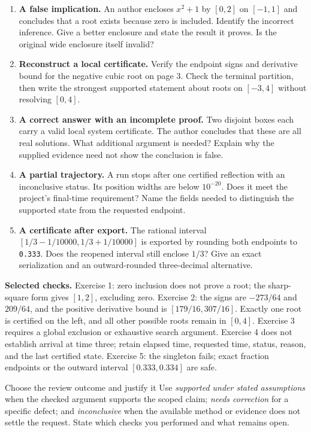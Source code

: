 \begin{enumerate}
\item \textbf{A false implication.} An author encloses $x^2+1$ by $[0,2]$
on $[-1,1]$ and concludes that a root exists because zero is included.
Identify the incorrect inference. Give a better enclosure and state the
result it proves. Is the original wide enclosure itself invalid?

\item \textbf{Reconstruct a local certificate.} Verify the endpoint signs
and derivative bound for the negative cubic root on page 3. Check the
terminal partition, then write the strongest supported statement about
roots on $[-3,4]$ without resolving $[0,4]$.

\item \textbf{A correct answer with an incomplete proof.} Two disjoint
boxes each carry a valid local system certificate. The author concludes
that these are all real solutions. What additional argument is needed?
Explain why the supplied evidence need not show the conclusion is false.

\item \textbf{A partial trajectory.} A run stops after one certified
reflection with an inconclusive status. Its position widths are below
$10^{-20}$. Does it meet the project's final-time requirement? Name the
fields needed to distinguish the supported state from the requested endpoint.

\item \textbf{A certificate after export.} The rational interval
$[1/3-1/10000,1/3+1/10000]$ is exported by rounding both endpoints to
\texttt{0.333}. Does the reopened interval still enclose $1/3$? Give
an exact serialization and an outward-rounded three-decimal alternative.
\end{enumerate}

\textbf{Selected checks.} Exercise 1: zero inclusion does not prove a
root; the sharp-square form gives $[1,2]$, excluding zero. Exercise 2:
the signs are $-273/64$ and $209/64$, and the positive derivative bound
is $[179/16,307/16]$. Exactly one root is certified on the left, and all
other possible roots remain in $[0,4]$. Exercise 3 requires a global
exclusion or exhaustive search argument. Exercise 4 does not establish
arrival at time three; retain elapsed time, requested time, status, reason,
and the last certified state. Exercise 5: the singleton fails; exact
fraction endpoints or the outward interval $[0.333,0.334]$ are safe.

\begin{question}{Choose the review outcome and justify it}
Use \emph{supported under stated assumptions} when the checked argument
supports the scoped claim; \emph{needs correction} for a specific defect;
and \emph{inconclusive} when the available method or evidence does not settle
the request. State which checks you performed and what remains open.
\end{question}

